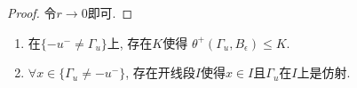 \begin{proof}
    令$r \to 0$即可.
\end{proof}
\begin{lemma}\label{vis_abp_l3}
    \s 
    \begin{enumerate}
        \item 在$\{-u^- \ne \Gamma_u\}$上, 存在$K$使得 $\theta^+(\Gamma_u, B_\epsilon) \le K$.  
        \item $\forall x \in \{\Gamma_u \ne -u^-\}$, 存在开线段$I$使得$x \in I$且$\Gamma_u$在$I$上是仿射.  
    \end{enumerate}
\end{lemma}
